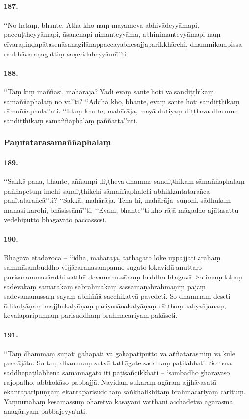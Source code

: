 \paragraph{187.} ‘‘No hetaṃ, bhante. Atha kho naṃ mayameva abhivādeyyāmapi, paccuṭṭheyyāmapi, āsanenapi nimanteyyāma, abhinimanteyyāmapi naṃ cīvarapiṇḍapātasenāsanagilānappaccayabhesajjaparikkhārehi, dhammikampissa rakkhāvaraṇaguttiṃ saṃvidaheyyāmā’’ti.

\paragraph{188.} ‘‘Taṃ kiṃ maññasi, mahārāja? Yadi evaṃ sante hoti vā sandiṭṭhikaṃ sāmaññaphalaṃ no vā’’ti? ‘‘Addhā kho, bhante, evaṃ sante hoti sandiṭṭhikaṃ sāmaññaphala’’nti. ‘‘Idaṃ kho te, mahārāja, mayā dutiyaṃ diṭṭheva dhamme sandiṭṭhikaṃ sāmaññaphalaṃ paññatta’’nti.

\subsubsection{Paṇītatarasāmaññaphalaṃ}

\paragraph{189.} ‘‘Sakkā pana, bhante, aññampi diṭṭheva dhamme sandiṭṭhikaṃ sāmaññaphalaṃ paññapetuṃ imehi sandiṭṭhikehi sāmaññaphalehi abhikkantatarañca paṇītatarañcā’’ti? ‘‘Sakkā, mahārāja. Tena hi, mahārāja, suṇohi, sādhukaṃ manasi karohi, bhāsissāmī’’ti. ‘‘Evaṃ, bhante’’ti kho rājā māgadho ajātasattu vedehiputto bhagavato paccassosi.

\paragraph{190.} Bhagavā etadavoca – ‘‘idha, mahārāja, tathāgato loke uppajjati arahaṃ sammāsambuddho vijjācaraṇasampanno sugato lokavidū anuttaro purisadammasārathi satthā devamanussānaṃ buddho bhagavā. So imaṃ lokaṃ sadevakaṃ samārakaṃ sabrahmakaṃ sassamaṇabrāhmaṇiṃ pajaṃ sadevamanussaṃ sayaṃ abhiññā sacchikatvā pavedeti. So dhammaṃ deseti ādikalyāṇaṃ majjhekalyāṇaṃ pariyosānakalyāṇaṃ sātthaṃ sabyañjanaṃ, kevalaparipuṇṇaṃ parisuddhaṃ brahmacariyaṃ pakāseti.

\paragraph{191.} ‘‘Taṃ dhammaṃ suṇāti gahapati vā gahapatiputto vā aññatarasmiṃ vā kule paccājāto. So taṃ dhammaṃ sutvā tathāgate saddhaṃ paṭilabhati. So tena saddhāpaṭilābhena samannāgato iti paṭisañcikkhati – ‘sambādho gharāvāso rajopatho, abbhokāso pabbajjā. Nayidaṃ sukaraṃ agāraṃ ajjhāvasatā ekantaparipuṇṇaṃ ekantaparisuddhaṃ saṅkhalikhitaṃ brahmacariyaṃ carituṃ. Yaṃnūnāhaṃ kesamassuṃ ohāretvā kāsāyāni vatthāni acchādetvā agārasmā anagāriyaṃ pabbajeyya’nti.

